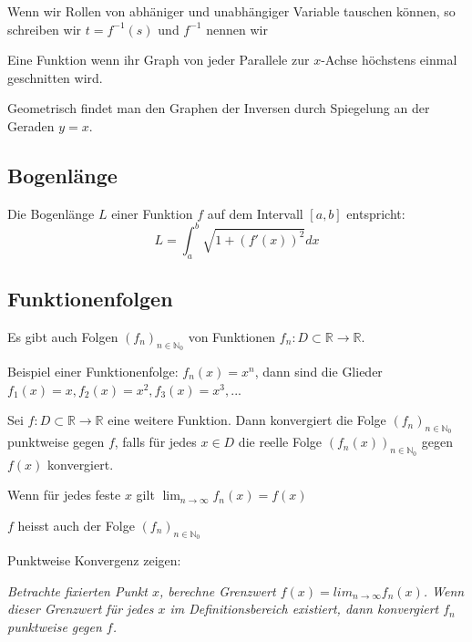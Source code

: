 \subsubsection{}

Wenn wir Rollen von abhäniger und unabhängiger Variable tauschen können, so schreiben wir $t=f^{-1}(s)$ und $f^{-1}$ nennen wir 

Eine Funktion  wenn ihr Graph von jeder Parallele zur $x$-Achse höchstens einmal geschnitten wird.

Geometrisch findet man den Graphen der Inversen durch Spiegelung an der Geraden $y=x$.

\subsection{Bogenlänge}

Die Bogenlänge $L$ einer Funktion $f$ auf dem Intervall $[a,b]$ entspricht:
$$L = \int_a^b \sqrt{1 + (f'(x))^2}dx$$

\subsection{Funktionenfolgen}

Es gibt auch Folgen $(f_n)_{n \in \mathbb{N}_0}$ von Funktionen $f_n: D \subset \mathbb{R} \rightarrow \mathbb{R}$.

\begin{exercise}
    Beispiel einer Funktionenfolge: $f_n(x)=x^n$, dann sind die Glieder $f_1(x)=x, f_2(x)=x^2, f_3(x)=x^3, ...$
\end{exercise}

Sei $f : D \subset \mathbb{R} \rightarrow \mathbb{R}$ eine weitere Funktion. Dann konvergiert die Folge $(f_n)_{n \in \mathbb{N}_0}$ punktweise gegen $f$, falls für jedes $x \in D$ die reelle Folge $(f_n(x))_{n \in \mathbb{N}_0}$ gegen $f(x)$ konvergiert.

Wenn für jedes feste $x$ gilt $\lim_{n \rightarrow \infty} f_n(x)=f(x)$

$f$ heisst auch  der Folge $(f_n)_{n \in \mathbb{N}_0}$

\begin{exercise}
    Punktweise Konvergenz zeigen:

    \textit{Betrachte fixierten Punkt $x$, berechne Grenzwert $f(x)=lim_{n \rightarrow \infty} f_n(x)$. Wenn dieser Grenzwert für jedes $x$ im Definitionsbereich existiert, dann konvergiert $f_n$ punktweise gegen $f$.}
\end{exercise}

